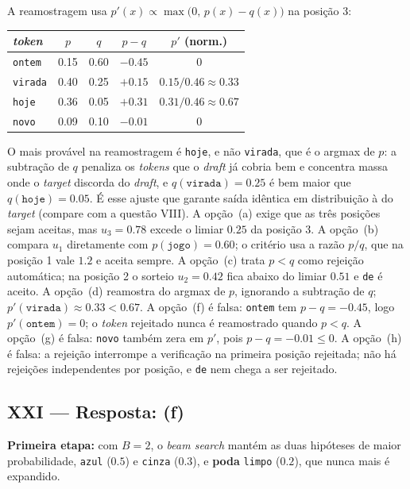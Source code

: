\documentclass{dlproblemset}
\begin{document}
A reamostragem usa $p'(x) \propto \max\bigl(0,\, p(x) - q(x)\bigr)$ na posição 3:
\begin{center}
\begin{tabular}{lcccc}
  \toprule
  \textit{token} & $p$ & $q$ & $p - q$ & $p'$ (norm.) \\
  \midrule
  \texttt{ontem}  & 0.15 & 0.60 & $-0.45$ & $0$ \\
  \texttt{virada} & 0.40 & 0.25 & $+0.15$ & $0.15/0.46 \approx 0.33$ \\
  \texttt{hoje}   & 0.36 & 0.05 & $+0.31$ & $0.31/0.46 \approx 0.67$ \\
  \texttt{novo}   & 0.09 & 0.10 & $-0.01$ & $0$ \\
  \bottomrule
\end{tabular}
\end{center}
O mais provável na reamostragem é \texttt{hoje}, e não \texttt{virada}, que é o argmax
de $p$: a subtração de $q$ penaliza os \textit{tokens} que o \textit{draft} já cobria
bem e concentra massa onde o \textit{target} discorda do \textit{draft}, e
$q(\texttt{virada}) = 0.25$ é bem maior que $q(\texttt{hoje}) = 0.05$. É esse ajuste
que garante saída idêntica em distribuição à do \textit{target} (compare com a
questão VIII).
A opção~(a) exige que as três posições sejam aceitas, mas $u_3 = 0.78$ excede o limiar
$0.25$ da posição 3.
A opção~(b) compara $u_1$ diretamente com $p(\texttt{jogo}) = 0.60$; o critério usa a
razão $p/q$, que na posição 1 vale $1.2$ e aceita sempre.
A opção~(c) trata $p < q$ como rejeição automática; na posição 2 o sorteio $u_2 = 0.42$
fica abaixo do limiar $0.51$ e \texttt{de} é aceito.
A opção~(d) reamostra do argmax de $p$, ignorando a subtração de $q$;
$p'(\texttt{virada}) \approx 0.33 < 0.67$.
A opção~(f) é falsa: \texttt{ontem} tem $p - q = -0.45$, logo $p'(\texttt{ontem}) = 0$;
o \textit{token} rejeitado nunca é reamostrado quando $p < q$.
A opção~(g) é falsa: \texttt{novo} também zera em $p'$, pois $p - q = -0.01 \le 0$.
A opção~(h) é falsa: a rejeição interrompe a verificação na primeira posição rejeitada;
não há rejeições independentes por posição, e \texttt{de} nem chega a ser rejeitado.

\subsection*{XXI — Resposta: (f)}
\textbf{Primeira etapa:} com $B = 2$, o \textit{beam search} mantém as duas hipóteses de
maior probabilidade, \texttt{azul} ($0.5$) e \texttt{cinza} ($0.3$), e \textbf{poda}
\texttt{limpo} ($0.2$), que nunca mais é expandido.
\end{document}

